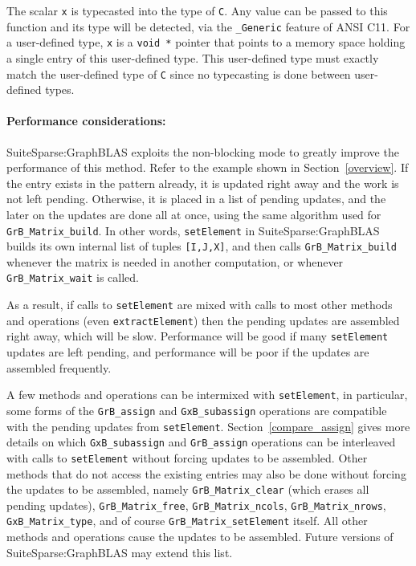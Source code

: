 \documentclass[12pt]{article}
\begin{document}
The scalar \verb'x' is typecasted into the type of \verb'C'.  Any value can be
passed to this function and its type will be detected, via the \verb'_Generic'
feature of ANSI C11.  For a user-defined type, \verb'x' is a \verb'void *'
pointer that points to a memory space holding a single entry of this
user-defined type.  This user-defined type must exactly match the user-defined
type of \verb'C' since no typecasting is done between user-defined types.

\paragraph{\bf Performance considerations:} %
SuiteSparse:GraphBLAS exploits the non-blocking mode to greatly improve the
performance of this method.  Refer to the example shown in
Section~\ref{overview}.  If the entry exists in the pattern already, it is
updated right away and the work is not left pending.  Otherwise, it is placed
in a list of pending updates, and the later on the updates are done all at
once, using the same algorithm used for \verb'GrB_Matrix_build'.  In other
words, \verb'setElement' in SuiteSparse:GraphBLAS builds its own internal list
of tuples \verb'[I,J,X]', and then calls \verb'GrB_Matrix_build' whenever the
matrix is needed in another computation, or whenever \verb'GrB_Matrix_wait' is
called.

As a result, if calls to \verb'setElement' are mixed with calls to most other
methods and operations (even \verb'extractElement') then the pending updates
are assembled right away, which will be slow.  Performance will be good if many
\verb'setElement' updates are left pending, and performance will be poor if the
updates are assembled frequently.

A few methods and operations can be intermixed with \verb'setElement', in
particular, some forms of the \verb'GrB_assign' and \verb'GxB_subassign'
operations are compatible with the pending updates from \verb'setElement'.
Section~\ref{compare_assign} gives more details on which \verb'GxB_subassign'
and \verb'GrB_assign' operations can be interleaved with calls to
\verb'setElement' without forcing updates to be assembled.  Other methods that
do not access the existing entries may also be done without forcing the updates
to be assembled, namely \verb'GrB_Matrix_clear' (which erases all pending
updates), \verb'GrB_Matrix_free', \verb'GrB_Matrix_ncols',
\verb'GrB_Matrix_nrows', \verb'GxB_Matrix_type', and of course
\verb'GrB_Matrix_setElement' itself.  All other methods and operations cause
the updates to be assembled.  Future versions of SuiteSparse:GraphBLAS may
extend this list.
\end{document}
